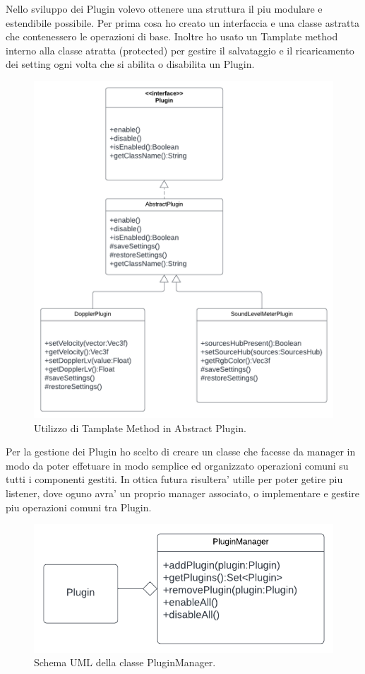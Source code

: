 \documentclass[a4paper,12pt]{report}
\begin{document}
%
Nello sviluppo dei Plugin volevo ottenere una struttura il piu modulare e estendibile possibile. Per prima cosa ho creato un interfaccia e una classe astratta che contenessero le operazioni di base. Inoltre ho usato un Tamplate method interno alla classe atratta (protected) per gestire il salvataggio e il ricaricamento dei setting ogni volta che si abilita o disabilita un Plugin.
\begin{figure}[H]
\centering{}
\includegraphics[width=\textwidth]{img/listener/Plugin.png}
\caption{Utilizzo di Tamplate Method in Abstract Plugin.}
\label{img:Listener}
\end{figure}
%
Per la gestione dei Plugin ho scelto di creare un classe che facesse da manager in modo da poter effetuare in modo semplice ed organizzato operazioni comuni su tutti i componenti gestiti. In ottica futura risultera' utille per poter getire piu listener, dove oguno avra' un proprio manager associato, o implementare e  gestire piu operazioni comuni tra Plugin.
\begin{figure}[H]
\centering{}
\includegraphics[width=\textwidth]{img/listener/PluginManager.png}
\caption{Schema UML della classe PluginManager.}
\label{img:Listener}
\end{figure}
\end{document}
